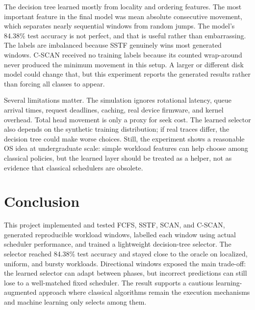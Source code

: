 \documentclass[11pt,a4paper]{article}
\begin{document}
The decision tree learned mostly from locality and ordering features. The most important feature in the final model was mean absolute consecutive movement, which separates nearly sequential windows from random jumps. The model's 84.38\% test accuracy is not perfect, and that is useful rather than embarrassing. The labels are imbalanced because SSTF genuinely wins most generated windows. C-SCAN received no training labels because its counted wrap-around never produced the minimum movement in this setup. A larger or different disk model could change that, but this experiment reports the generated results rather than forcing all classes to appear.

Several limitations matter. The simulation ignores rotational latency, queue arrival times, request deadlines, caching, real device firmware, and kernel overhead. Total head movement is only a proxy for seek cost. The learned selector also depends on the synthetic training distribution; if real traces differ, the decision tree could make worse choices. Still, the experiment shows a reasonable OS idea at undergraduate scale: simple workload features can help choose among classical policies, but the learned layer should be treated as a helper, not as evidence that classical schedulers are obsolete.

\section{Conclusion}
This project implemented and tested FCFS, SSTF, SCAN, and C-SCAN, generated reproducible workload windows, labelled each window using actual scheduler performance, and trained a lightweight decision-tree selector. The selector reached 84.38\% test accuracy and stayed close to the oracle on localized, uniform, and bursty workloads. Directional windows exposed the main trade-off: the learned selector can adapt between phases, but incorrect predictions can still lose to a well-matched fixed scheduler. The result supports a cautious learning-augmented approach where classical algorithms remain the execution mechanisms and machine learning only selects among them.



\end{document}
